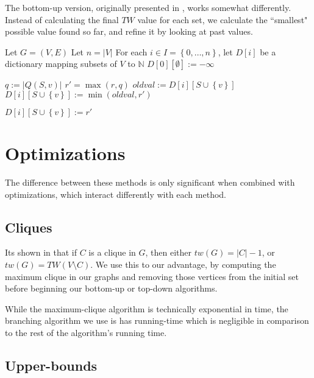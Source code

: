 \documentclass{article}
\newcommand\abs[1]{\left|#1\right|}
\newcommand\set[1]{\left\{#1\right\}}
\newcommand\natnum{\mathbb{N}}
\begin{document}
The bottom-up version, originally presented in \cite{exact},
works somewhat differently.
Instead of calculating the final $TW$ value for each set,
we calculate the ``smallest" possible value found so far,
and refine it by looking at past values.

\begin{algorithm}[H]
    Let $G = (V,E)$\;
    Let $n = \abs{V}$\;
    For each $i \in I=\set{0, \ldots, n}$, let $D[i]$ be a dictionary mapping subsets of $V$ to $\natnum$\;
    $D[0][\emptyset] := -\infty$\;
    \For{$i \in \set{1 \ldots, n}$}
    {
        {
            {
                $q := \abs{Q(S,v)}$\;
                $r' = \max(r,q)$\;
                \If{$D[i]$ contains $S \cup \set{v}$}
                {
                    $oldval := D[i][S \cup \set{v}]$\;
                    $D[i][S \cup \set{v}] := \min(oldval, r')$\;
                }
                \Else
                {
                    $D[i][S \cup \set{v}] := r'$\;
                    
                }
            }
        }
    }
\;

\end{algorithm}

\section{Optimizations}

The difference between these methods is only significant when combined
with optimizations, which interact differently with each method.

\subsection{Cliques}

Its shown in \cite{upperBound} that if $C$ is a clique in $G$, then either
$tw(G) = \abs{C}-1$, or $tw(G) = TW(V \setminus C)$. We use this to our advantage,
by computing the maximum clique in our graphs and removing those vertices from the initial set
before beginning our bottom-up or top-down algorithms.

While the maximum-clique algorithm is technically exponential in time,
the branching algorithm we use is has running-time which is negligible
in comparison to the rest of the algorithm's running time.

\subsection{Upper-bounds}
\end{document}
